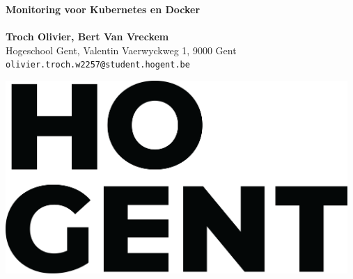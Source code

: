 \documentclass[a0,portrait]{a0poster}
\begin{document}


\begin{minipage}[t]{0.75\linewidth}
\VeryHuge \color{HoGentAccent1} \textbf{Monitoring voor Kubernetes en Docker} \color{Black}\\ %
\Huge\textit{}\\[2.4cm] %
\huge \textbf{Troch Olivier, Bert Van Vreckem}\\[0.5cm] %
\huge Hogeschool Gent, Valentin Vaerwyckweg 1, 9000 Gent\\[0.4cm] %
\Large \texttt{olivier.troch.w2257@student.hogent.be} \\
\end{minipage}
%
\begin{minipage}[t]{0.25\linewidth}
\includegraphics[width=13cm,right]{figures/HOGENT_Logo_Pos_rgb.png} 

\end{minipage}

\vspace{1cm} %

\end{document}
